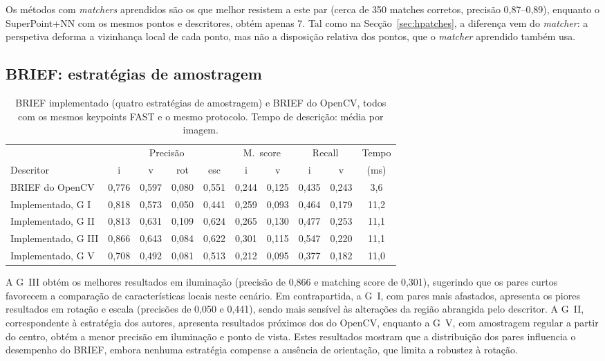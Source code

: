 \documentclass[11pt,a4paper]{article}
\begin{document}
Os métodos com \textit{matchers} aprendidos são os que melhor resistem a este par (cerca de 350 matches corretos, precisão 0,87--0,89), enquanto o SuperPoint+NN com os mesmos pontos e descritores, obtém apenas 7. Tal como na Secção~\ref{sec:hpatches}, a diferença vem do \textit{matcher}: a perspetiva deforma a vizinhança local de cada ponto, mas não a disposição relativa dos pontos, que o \textit{matcher} aprendido também usa.



\subsection{BRIEF: estratégias de amostragem}
\begin{table}[H]
\centering\small
\caption{BRIEF implementado (quatro estratégias de amostragem) e BRIEF do OpenCV, todos com os mesmos
keypoints FAST e o mesmo protocolo. Tempo de descrição: média por imagem.}
\label{tab:brief}
\setlength{\tabcolsep}{4pt}
\begin{tabular}{lccccccccc}
\toprule
 & \multicolumn{4}{c}{Precisão} & \multicolumn{2}{c}{M.~score} & \multicolumn{2}{c}{Recall} & Tempo \\
\cmidrule(lr){2-5}\cmidrule(lr){6-7}\cmidrule(lr){8-9}
Descritor & i & v & rot & esc & i & v & i & v & (ms) \\
\midrule
BRIEF do OpenCV & 0,776 & 0,597 & 0,080 & 0,551 & 0,244 & 0,125 & 0,435 & 0,243 & 3,6 \\
Implementado, G I & 0,818 & 0,573 & 0,050 & 0,441 & 0,259 & 0,093 & 0,464 & 0,179 & 11,2 \\
Implementado, G II & 0,813 & 0,631 & 0,109 & 0,624 & 0,265 & 0,130 & 0,477 & 0,253 & 11,1 \\
Implementado, G III & 0,866 & 0,643 & 0,084 & 0,622 & 0,301 & 0,115 & 0,547 & 0,220 & 11,1 \\
Implementado, G V & 0,708 & 0,492 & 0,081 & 0,513 & 0,212 & 0,095 & 0,377 & 0,182 & 11,0 \\
\bottomrule
\end{tabular}
\end{table}

A G~III obtém os melhores resultados em iluminação (precisão de 0,866 e matching score de 0,301), sugerindo que os pares curtos favorecem a comparação de características locais neste cenário. Em contrapartida, a G~I, com pares mais afastados, apresenta os piores resultados em rotação e escala (precisões de 0,050 e 0,441), sendo mais sensível às alterações da região abrangida pelo descritor. A G~II, correspondente à estratégia dos autores, apresenta resultados próximos dos do OpenCV, enquanto a G~V, com amostragem regular a partir do centro, obtém a menor precisão em iluminação e ponto de vista. Estes resultados mostram que a distribuição dos pares influencia o desempenho do BRIEF, embora nenhuma estratégia compense a ausência de orientação, que limita a robustez à rotação. 
\end{document}
